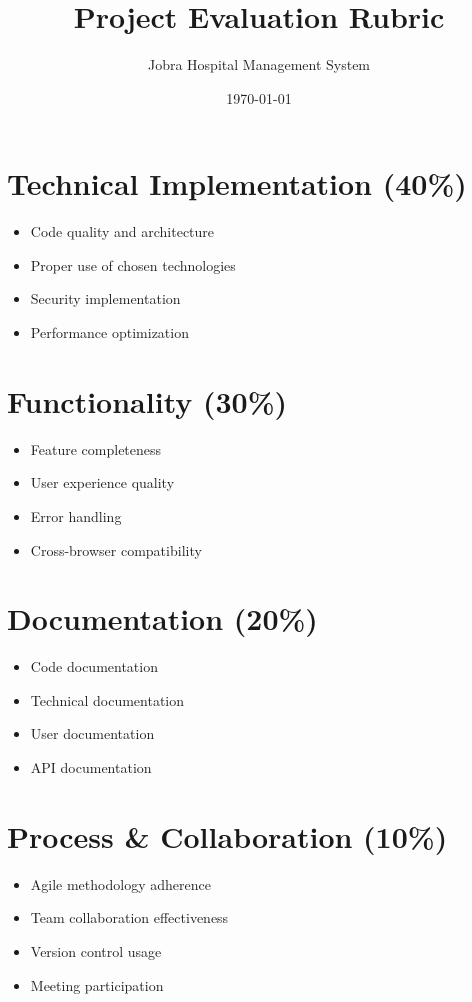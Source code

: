 \documentclass[12pt,a4paper]{article}
\title{Project Evaluation Rubric}
\author{Jobra Hospital Management System}
\date{\today}
\begin{document}
\maketitle

\section{Technical Implementation (40\%)}
\begin{itemize}[leftmargin=*, itemsep=0.35em]
  \item Code quality and architecture
  \item Proper use of chosen technologies
  \item Security implementation
  \item Performance optimization
\end{itemize}

\section{Functionality (30\%)}
\begin{itemize}[leftmargin=*, itemsep=0.35em]
  \item Feature completeness
  \item User experience quality
  \item Error handling
  \item Cross-browser compatibility
\end{itemize}

\section{Documentation (20\%)}
\begin{itemize}[leftmargin=*, itemsep=0.35em]
  \item Code documentation
  \item Technical documentation
  \item User documentation
  \item API documentation
\end{itemize}

\section{Process \& Collaboration (10\%)}
\begin{itemize}[leftmargin=*, itemsep=0.35em]
  \item Agile methodology adherence
  \item Team collaboration effectiveness
  \item Version control usage
  \item Meeting participation
\end{itemize}
\end{document}
